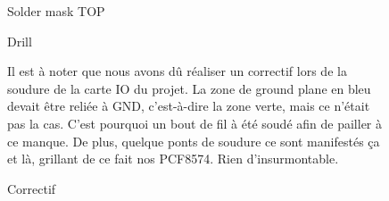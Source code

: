 \documentclass[10pt,a4paper,final]{article}
\begin{document}
\begin{spacing}{1.5}
\begin{figure}[hbtp]
\caption{Solder mask TOP}
\end{figure}



\begin{figure}[hbtp]
\caption{Drill}
\centering
{}

\bigskip
\bigskip
\bigskip
\bigskip
\bigskip

\caption{Correctif}

\bigskip

\begin{flushleft}
Il est à noter que nous avons dû réaliser un correctif lors de la soudure de la carte IO du projet. La zone de ground plane en bleu devait être reliée à GND, c'est-à-dire la zone verte, mais ce n'était pas la cas. C'est pourquoi un bout de fil à été soudé afin de pailler à ce manque. De plus, quelque ponts de soudure ce sont manifestés ça et là, grillant de ce fait nos PCF8574. Rien d'insurmontable.
\end{flushleft}
\end{figure}

\vfill
\pagebreak







\end{spacing}
\end{document}
